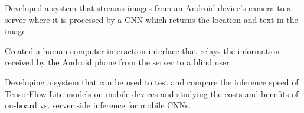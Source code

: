 \documentclass[letterpaper]{deedy-resume} %
\begin{document}
\begin{minipage}[t]{0.66\textwidth}

\begin{tightitemize}
	\item Developed a system that streams images from an Android device's  camera to a server where it is processed by a CNN which returns the location and text in the image
	\item Created a human computer interaction interface that relays the information received by the Android phone from the server to a blind user
	\item Developing a system that can be used to test and compare the inference speed of TensorFlow Lite models on mobile devices and studying the costs and benefits of on-board vs. server side inference for mobile CNNs.
\end{tightitemize}
\sectionspace %


\end{minipage} %


\newpage %
\end{document}
